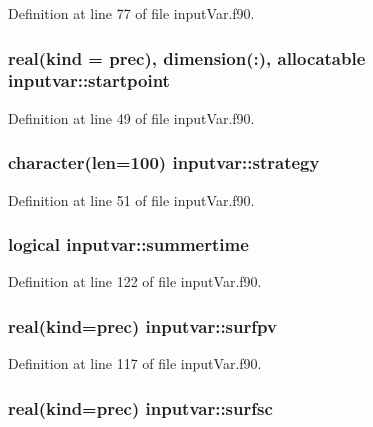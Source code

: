 Definition at line 77 of file input\-Var.\-f90.

\hypertarget{classinputvar_a3b9acf8a358a0bad89d622cbbbab638f}{
\subsubsection[{startpoint}]{\setlength{\rightskip}{0pt plus 5cm}real(kind = prec), dimension(\-:), allocatable inputvar\-::startpoint}}\label{classinputvar_a3b9acf8a358a0bad89d622cbbbab638f}


Definition at line 49 of file input\-Var.\-f90.

\hypertarget{classinputvar_a6e328846c755855ac2ac87d5a63d402a}{
\subsubsection[{strategy}]{\setlength{\rightskip}{0pt plus 5cm}character(len=100) inputvar\-::strategy}}\label{classinputvar_a6e328846c755855ac2ac87d5a63d402a}


Definition at line 51 of file input\-Var.\-f90.

\hypertarget{classinputvar_aec499a973401b90a01f106d089b0e982}{
\subsubsection[{summertime}]{\setlength{\rightskip}{0pt plus 5cm}logical inputvar\-::summertime}}\label{classinputvar_aec499a973401b90a01f106d089b0e982}


Definition at line 122 of file input\-Var.\-f90.

\hypertarget{classinputvar_a96c41574bce3d9f6f6493a87e1a5147e}{
\subsubsection[{surfpv}]{\setlength{\rightskip}{0pt plus 5cm}real(kind=prec) inputvar\-::surfpv}}\label{classinputvar_a96c41574bce3d9f6f6493a87e1a5147e}


Definition at line 117 of file input\-Var.\-f90.

\hypertarget{classinputvar_a8a591d3ec84f2b1c645a06110935e7cd}{
\subsubsection[{surfsc}]{\setlength{\rightskip}{0pt plus 5cm}real(kind=prec) inputvar\-::surfsc}}\label{classinputvar_a8a591d3ec84f2b1c645a06110935e7cd}


